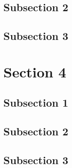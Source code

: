 \documentclass{beamer}
\begin{document}
    \subsection{Subsection 2}
    \frame{}
    \frame{}

    \subsection{Subsection 3}
    \frame{}
    \frame{}
    \frame{}

    \section{Section 4}

    \subsection{Subsection 1}
    \frame{}
    \frame{}

    \subsection{Subsection 2}
    \frame{}
    \frame{}

    \subsection{Subsection 3}
    \frame{}
    \frame{}
    \frame{}
\end{document}
